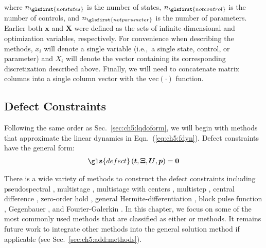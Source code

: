 \noindent where $n_{\glsfirst{notstates}}$ is the number of states, $n_{\glsfirst{notcontrol}}$ is the number of controls, and $n_{\glsfirst{notparameter}}$ is the number of parameters.
Earlier both $\bm{x}$ and $\bm{X}$ were defined as the sets of infinite-dimensional and \qp{} optimization variables, respectively. 
For convenience when describing the methods, $x_i$ will denote a single variable (i.e.,~a single state, control, or parameter) and $X_i$ will denote the vector containing its corresponding discretization described above.
Finally, we will need to concatenate matrix columns into a single column vector with the $\mathrm{vec}(\cdot)$ function. 

\subsection{Defect Constraints} \label{sec:ch5:defects}

Following the same order as Sec.~\ref{sec:ch5:lqdoform}, we will begin with \dt{} methods that approximate the linear dynamics in Eqn.~(\ref{eq:ch5:fdyn}). Defect constraints have the general form:
\begin{align}
\gls{defect}\left(\bm{t}, \bm{\Xi}, \bm{U}, \bm{p} \right) = \bm{0}
\end{align}

There is a wide variety of methods to construct the defect constraints including pseudospectral \cite{Becerra2010b, Fahroo2002a, Fahroo2008a, Herber2015a, Patterson2014a, Rao2010a}, multistage \cite{Rao2010a, Betts1998a, Bittner2017a, Pardo2016a, Sonawane2016a}, multistage with centers \cite{Betts1998b, Williams2005a}, multistep \cite{Rao2010a, Betts1998a}, central difference \cite{Becerra2015a}, zero-order hold \cite{Amrit2013a, Hals2011a}, general Hermite-differentiation \cite{Williams2005a, Williams2009a},
block pulse function \cite{Hwang1986a}, Gegenbauer \cite{Elgindy2013a}, and Fourier-Galerkin \cite{Bacelli2015a}.
In this chapter, we focus on some of the most commonly used methods that are classified as either  or  methods.
It remains future work to integrate other \dt{} methods into the general solution method if applicable (see Sec.~\ref{sec:ch5:add:methods}). 

